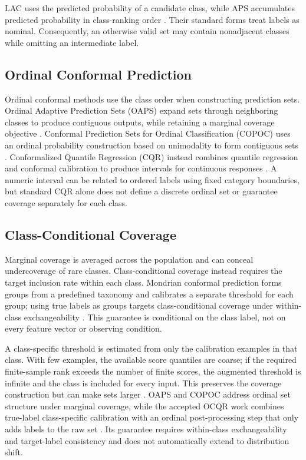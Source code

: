 \documentclass[12pt]{report}
\begin{document}
LAC uses the predicted probability of a candidate class, while APS accumulates predicted probability in class-ranking order \citep{sadinle2019least,angelopoulos2020uncertainty,romano2020classification}. Their standard forms treat labels as nominal. Consequently, an otherwise valid set may contain nonadjacent classes while omitting an intermediate label.

\subsection{Ordinal Conformal Prediction}

Ordinal conformal methods use the class order when constructing prediction sets. Ordinal Adaptive Prediction Sets (OAPS) expand sets through neighboring classes to produce contiguous outputs, while retaining a marginal coverage objective \citep{lu2022ordinalaps}. Conformal Prediction Sets for Ordinal Classification (COPOC) uses an ordinal probability construction based on unimodality to form contiguous sets \citep{dey2023copoc}. Conformalized Quantile Regression (CQR) instead combines quantile regression and conformal calibration to produce intervals for continuous responses \citep{romano2019cqr}. A numeric interval can be related to ordered labels using fixed category boundaries, but standard CQR alone does not define a discrete ordinal set or guarantee coverage separately for each class.

\subsection{Class-Conditional Coverage}

Marginal coverage is averaged across the population and can conceal undercoverage of rare classes. Class-conditional coverage instead requires the target inclusion rate within each class. Mondrian conformal prediction forms groups from a predefined taxonomy and calibrates a separate threshold for each group; using true labels as groups targets class-conditional coverage under within-class exchangeability \citep{vovk2005algorithmic,vovk2012conditional}. This guarantee is conditional on the class label, not on every feature vector or observing condition.

A class-specific threshold is estimated from only the calibration examples in that class. With few examples, the available score quantiles are coarse; if the required finite-sample rank exceeds the number of finite scores, the augmented threshold is infinite and the class is included for every input. This preserves the coverage construction but can make sets larger \citep{ding2023classconditional}. OAPS and COPOC address ordinal set structure under marginal coverage, while the accepted OCQR work combines true-label class-specific calibration with an ordinal post-processing step that only adds labels to the raw set \citep{hong2026ocqr}. Its guarantee requires within-class exchangeability and target-label consistency and does not automatically extend to distribution shift.
\end{document}
